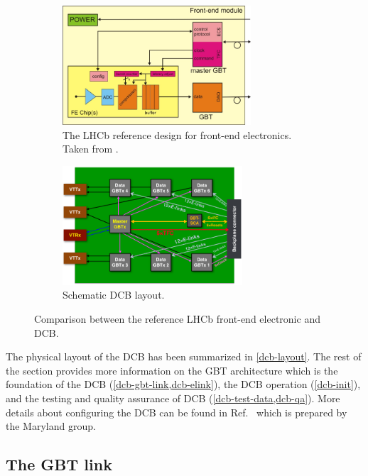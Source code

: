\begin{figure}[!htb]
    \centering
    \begin{subfigure}[t]{0.46\textwidth}
        \centering
        \includegraphics[height=12em]{./figs-ut-upgrade/dcb/lhcb_ref_fe.pdf}
        \caption{
            The LHCb reference design for front-end electronics.
            Taken from \cite{Wyllie:2011sya}.
        }
        \label{fig:lhcb-ref-fe}
    \end{subfigure}
    \hfill
    \begin{subfigure}[t]{0.46\textwidth}
        \centering
        \includegraphics[height=12em]{./figs-ut-upgrade/dcb/dcb_schematic.pdf}
        \caption{
            Schematic DCB layout.
        }
        \label{fig:dcb-schematic}
    \end{subfigure}

    \caption{
        Comparison between the reference LHCb front-end electronic and DCB.
    }
\end{figure}

The physical layout of the DCB has been summarized in \cref{dcb-layout}.
The rest of the section provides more information
on the GBT architecture which is the foundation of the DCB
(\cref{dcb-gbt-link,dcb-elink}),
the DCB operation (\cref{dcb-init}),
and the testing and quality assurance of DCB (\cref{dcb-test-data,dcb-qa}).
More details about configuring the DCB can be found in
Ref.~\cite{UMD_DCB_op_man} which is prepared by the Maryland group.


\subsection{The GBT link}
\label{dcb-gbt-link}

